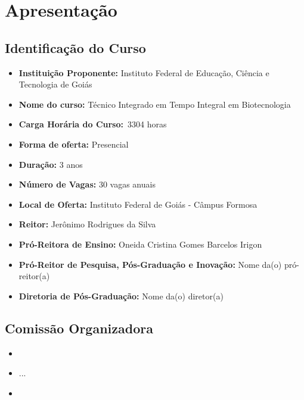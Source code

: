 \documentclass[11pt,fleqn]{book} %
\newcommand{\VER}[1]{\begingroup\color{red}#1\endgroup}
\begin{document}
\renewcommand\contentsname{Sumário}
\tableofcontents

\chapter{Apresentação}
\vspace{6em}
\begin{flushright}
	\textit{ }
\end{flushright}
\vspace{12em}
\indent


\section{Identificação do Curso}
\begin{itemize}
	\item \textbf{Instituição Proponente:} Instituto Federal de Educação, Ciência e Tecnologia de Goiás
	\item \textbf{Nome do curso:} Técnico Integrado em Tempo Integral em Biotecnologia
	\item \textbf{Carga Horária do Curso:}~\VER{3304} horas
	\item \textbf{Forma de oferta:} Presencial
	\item \textbf{Duração:} 3 anos
	\item \textbf{Número de Vagas:} 30 vagas anuais
	\item \textbf{Local de Oferta:} Instituto Federal de Goiás - Câmpus Formosa
	\item \textbf{Reitor:} Jerônimo Rodrigues da Silva
	\item \textbf{Pró-Reitora de Ensino:} Oneida Cristina Gomes Barcelos Irigon
	\item \textbf{Pró-Reitor de Pesquisa, Pós-Graduação e Inovação:} \VER{Nome da(o) pró-reitor(a)}
	\item \textbf{Diretoria de Pós-Graduação:} \VER{Nome da(o) diretor(a)}
\end{itemize}

\newpage  
\section{Comissão Organizadora}
	\begin{itemize}[label=\bfseries]
		\item {}
		\item ...
		\item {}
	\end{itemize}
\end{document}

